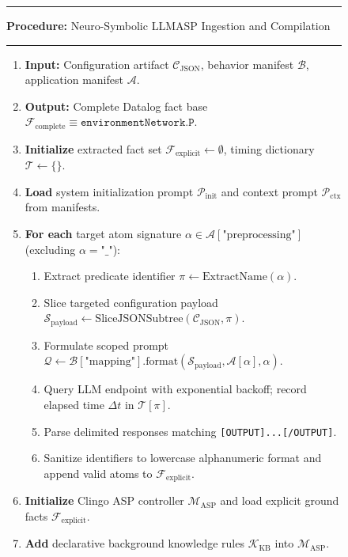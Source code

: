 \documentclass[target=mst,aauheader=aics,style=]{thud}
\begin{document}
\begin{figure}[htbp]
\centering
\begin{minipage}{0.96\textwidth}
\hrule\vspace{5pt}
\textbf{Procedure:} Neuro-Symbolic LLMASP Ingestion and Compilation
\vspace{3pt}\hrule\vspace{6pt}
\small
\begin{enumerate}
    \item \textbf{Input:} Configuration artifact $\mathcal{C}_{\text{JSON}}$, behavior manifest $\mathcal{B}$, application manifest $\mathcal{A}$.
    \item \textbf{Output:} Complete Datalog fact base $\mathcal{F}_{\text{complete}} \equiv \texttt{environmentNetwork.P}$.
    \item \textbf{Initialize} extracted fact set $\mathcal{F}_{\text{explicit}} \gets \emptyset$, timing dictionary $\mathcal{T} \gets \{\}$.
    \item \textbf{Load} system initialization prompt $\mathcal{P}_{\text{init}}$ and context prompt $\mathcal{P}_{\text{ctx}}$ from manifests.
    \item \textbf{For each} target atom signature $\alpha \in \mathcal{A}[\text{"preprocessing"}]$ (excluding $\alpha = \text{"\_"} $):
    \begin{enumerate}
        \item Extract predicate identifier $\pi \gets \text{ExtractName}(\alpha)$.
        \item Slice targeted configuration payload $\mathcal{S}_{\text{payload}} \gets \text{SliceJSONSubtree}(\mathcal{C}_{\text{JSON}}, \pi)$.
        \item Formulate scoped prompt $\mathcal{Q} \gets \mathcal{B}[\text{"mapping"}].\text{format}(\mathcal{S}_{\text{payload}}, \mathcal{A}[\alpha], \alpha)$.
        \item Query LLM endpoint with exponential backoff; record elapsed time $\Delta t$ in $\mathcal{T}[\pi]$.
        \item Parse delimited responses matching \texttt{[OUTPUT]...[/OUTPUT]}.
        \item Sanitize identifiers to lowercase alphanumeric format and append valid atoms to $\mathcal{F}_{\text{explicit}}$.
    \end{enumerate}
    \item \textbf{Initialize} Clingo ASP controller $\mathcal{M}_{\text{ASP}}$ and load explicit ground facts $\mathcal{F}_{\text{explicit}}$.
    \item \textbf{Add} declarative background knowledge rules $\mathcal{K}_{\text{KB}}$ into $\mathcal{M}_{\text{ASP}}$.

\end{enumerate}
\end{minipage}
\end{figure}
\end{document}
